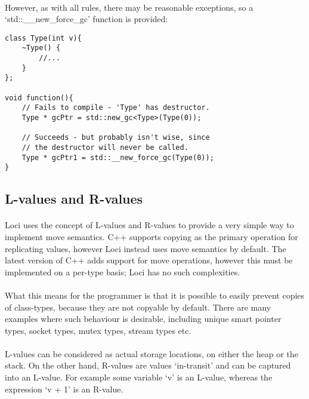 \documentclass[12pt,twoside,notitlepage]{report}
\begin{document}
\paragraph{}
However, as with all rules, there may be reasonable exceptions, so a `std::\_\_new\_force\_gc' function is provided:


\begin{lstlisting}
class Type(int v){
	~Type() {
		//...
	}
};

void function(){
	// Fails to compile - 'Type' has destructor.
	Type * gcPtr = std::new_gc<Type>(Type(0));
	
	// Succeeds - but probably isn't wise, since 
	// the destructor will never be called.
	Type * gcPtr1 = std::__new_force_gc(Type(0));
}
\end{lstlisting}


\clearpage

\subsection{L-values and R-values}

\paragraph{}
Loci uses the concept of L-values and R-values to provide a very simple way to implement move semantics. C++ supports copying as the primary operation for replicating values, however Loci instead uses move semantics by default. The latest version of C++ adds support for move operations, however this must be implemented on a per-type basis; Loci has no such complexities.

\paragraph{}
What this means for the programmer is that it is possible to easily prevent copies of class-types, because they are not copyable by default. There are many examples where such behaviour is desirable, including unique smart pointer types, socket types, mutex types, stream types etc.

\paragraph{}
L-values can be considered as actual storage locations, on either the heap or the stack. On the other hand, R-values are values `in-transit' and can be captured into an L-value. For example some variable `v' is an L-value, whereas the expression `v + 1' is an R-value.
\end{document}
